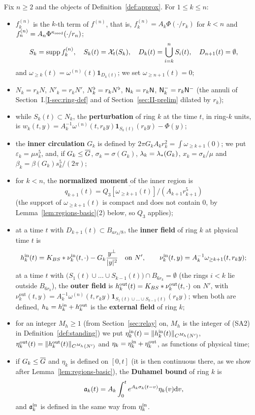 \begin{definition}
\label{def:regions}
Fix $n\ge2$ and the objects of Definition~\ref{def:approx}. For $1\le k\le n$:
\begin{itemize}
\item $f^{(n)}_k$ is the $k$-th term of $f^{(n)}$, that is,
  $f^{(n)}_k=A_k\Phi(\cdot/r_k)$ for $k<n$ and
  $f^{(n)}_n=A_n\Phi^{\kappa_{\mathrm{seed}}}(\cdot/r_n)$;
  \[
  S_k=\operatorname{supp} f^{(n)}_k,\quad S_k(t)=\mathcal{X}_t(S_k),\quad D_k(t)=\bigcup_{i=k}^nS_i(t),\quad
  D_{n+1}(t)=\emptyset,
  \]
  and $\omega_{\ge k}(t)=\omega^{(n)}(t)\mathbf 1_{D_k(t)}$;
  we set $\omega_{\ge n+1}(t)=0$;
\item $N_k=r_kN$, $N'_k=r_kN'$, $N^{\flat}_k=r_kN^{\flat}$, $\mathsf{N}_k=r_k\mathsf{N}$,
  $\mathsf{N}^{-}_k=r_k\mathsf{N}^{-}$ (the annuli of Section~I.\ref{I-sec:ring-def} and of Section~\ref{sec:II-prelim} dilated by $r_k$);
\item while $S_k(t)\subset N_k$, the \textbf{perturbation} of ring $k$ at the
  time $t$, in ring-$k$ units, is
  $w_k(t,y)=A_k^{-1}\omega^{(n)}(t,r_ky)\mathbf 1_{S_k(t)}(r_ky)-\Phi(y)$;
\item the \textbf{inner circulation} $G_k$ is defined by
  $2\pi G_kA_kr_k^2=\int\omega_{\ge k+1}(0)$; we put
  $\varepsilon_k=\mu s_k^5$, and, if $G_k\le\overline{G}$, $\sigma_k=\sigma(G_k)$,
  $\lambda_k=\lambda_*(G_k)$, $x_k=\sigma_k/\mu$ and
  $\beta_k=\beta(G_k)s_k^5/(2\pi)$;
\item for $k<n$, the \textbf{normalized moment} of the inner region is
  \[
  q_{k+1}(t)=\overline{Q_3[\omega_{\ge k+1}(t)]}/(A_{k+1}r_{k+1}^5)
  \]
  (the support of $\omega_{\ge k+1}(t)$ is compact and does not contain $0$, by
  Lemma~\ref{lem:regions-basic}\textup{(2)} below, so $Q_3$ applies);
\item at a time $t$ with $D_{k+1}(t)\subset B_{ar_k/8}$, the \textbf{inner field}
  of ring $k$ at physical time $t$ is
  \[
  h^{\mathrm{in}}_k(t)=K_{BS}\ast\nu^{\mathrm{in}}_k(t,\cdot)-G_k\frac{y^\perp}{|y|^2}\quad\text{on }N',\qquad
  \nu^{\mathrm{in}}_k(t,y)=A_k^{-1}\omega_{\ge k+1}(t,r_ky);
  \]
  at a time $t$ with $\big(S_1(t)\cup\dots\cup S_{k-1}(t)\big)\cap B_{6r_k}=\emptyset$
  (the rings $i<k$ lie outside $B_{6r_k}$), the \textbf{outer field} is
  $h^{\mathrm{out}}_k(t)=K_{BS}\ast\nu^{\mathrm{out}}_k(t,\cdot)$ on $N'$, with
  $\nu^{\mathrm{out}}_k(t,y)=A_k^{-1}\omega^{(n)}(t,r_ky)\mathbf 1_{S_1(t)\cup\dots\cup S_{k-1}(t)}(r_ky)$;
  when both are defined, $h_k=h^{\mathrm{in}}_k+h^{\mathrm{out}}_k$ is the \textbf{external field} of
  ring $k$;
\item for an integer $M_h\ge1$ (from Section~\ref{sec:relay} on, $M_h$ is the
  integer of \textup{(SA2)} in Definition~\ref{def:standing}) we put
  $\eta^{\mathrm{in}}_k(t)=\|h^{\mathrm{in}}_k(t)\|_{C^{M_h}(N')}$,
  $\eta^{\mathrm{out}}_k(t)=\|h^{\mathrm{out}}_k(t)\|_{C^{M_h}(N')}$ and $\eta_k=\eta^{\mathrm{in}}_k+\eta^{\mathrm{out}}_k$,
  as functions of physical time;
\item if $G_k\le\overline{G}$ and $\eta_k$ is defined on $[0,t]$ (it is then
  continuous there, as we show after Lemma~\ref{lem:regions-basic}), the
  \textbf{Duhamel bound} of ring $k$ is
  \[
  \mathfrak{a}_k(t)=A_k\int_0^t e^{A_k\sigma_k(t-v)}\eta_k(v)\dd v ,
  \]
  and $\mathfrak{a}^{\mathrm{in}}_k$ is defined in the same way from $\eta^{\mathrm{in}}_k$.
\end{itemize}
\end{definition}

